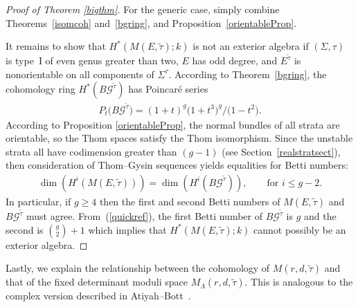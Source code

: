 \documentclass[10pt,a4paper]{amsart}
\numberwithin{equation}{section}
\begin{document}
\begin{proof}[Proof of Theorem \ref{bigthm}]
For the generic case, simply combine Theorems~\ref{isomcoh} and~\ref{bgring}, and Proposition~\ref{orientableProp}.

It remains to show that $H^*(M(E,\tilde{\tau});k)$ is not an exterior algebra if $(\Sigma,\tau)$ is type~I of even genus greater than two, $E$ has odd degree, and $E^{\tilde{\tau}}$ is nonorientable on all components of $\Sigma^{\tau}$. According to Theorem~\ref{bgring}, the cohomology ring $H^*(B{\mathcal G}^{\tilde{\tau}})$ has Poincar\'e series
\begin{gather}\label{quickref}
P_t\big(B{\mathcal G}^{\tilde{\tau}}\big) = (1+t)^g\big(1+t^3\big)^g/\big(1-t^2\big).
\end{gather} According to Proposition \ref{orientableProp}, the normal bundles of all strata are orientable, so the Thom spaces satisfy the Thom isomorphism. Since the unstable strata all have codimension greater than $(g-1)$ (see Section~\ref{realstratsect}), then consideration of Thom--Gysin sequences yields equalities for Betti numbers:
\begin{gather*}\dim(H^i(M(E,\tilde{\tau}))) = \dim(H^i( B{\mathcal G}^{\tilde{\tau}})),\qquad \text{for $i\leq g-2$}.\end{gather*}
In particular, if $g\geq 4$ then the f\/irst and second Betti numbers of $M(E,\tilde{\tau})$ and $B{\mathcal G}^{\tilde{\tau}}$ must agree. From~(\ref{quickref}), the f\/irst Betti number of $B{\mathcal G}^{\tilde{\tau}}$ is $g$ and the second is ${ g \choose 2}+1$ which implies that $H^*(M(E,\tilde{\tau});k)$ cannot possibly be an exterior algebra.
\end{proof}


Lastly, we explain the relationship between the cohomology of $M(r,d,\tilde{\tau})$ and that of the f\/ixed determinant moduli space $M_{\Lambda}(r,d,\tilde{\tau})$. This is analogous to the complex version described in Atiyah--Bott~\cite[p.~578]{AB}.
\end{document}
